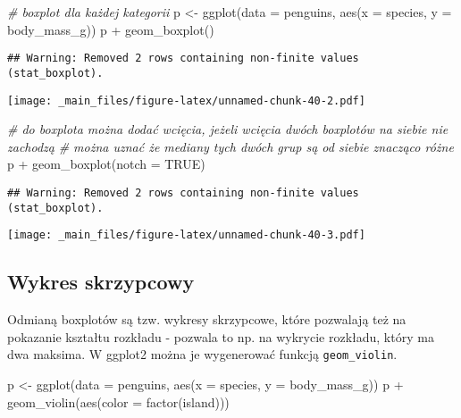 \documentclass[
]{book}
\newenvironment{Shaded}{\begin{snugshade}}{\end{snugshade}}
\newcommand{\AttributeTok}[1]{\textcolor[rgb]{0.77,0.63,0.00}{#1}}
\newcommand{\CommentTok}[1]{\textcolor[rgb]{0.56,0.35,0.01}{\textit{#1}}}
\newcommand{\ConstantTok}[1]{\textcolor[rgb]{0.00,0.00,0.00}{#1}}
\newcommand{\FunctionTok}[1]{\textcolor[rgb]{0.00,0.00,0.00}{#1}}
\newcommand{\NormalTok}[1]{#1}
\newcommand{\OtherTok}[1]{\textcolor[rgb]{0.56,0.35,0.01}{#1}}
\newcommand{\SpecialCharTok}[1]{\textcolor[rgb]{0.00,0.00,0.00}{#1}}
\begin{document}
\begin{Shaded}
\begin{Highlighting}[]
\CommentTok{\# boxplot dla każdej kategorii}
\NormalTok{p }\OtherTok{\textless{}{-}} \FunctionTok{ggplot}\NormalTok{(}\AttributeTok{data =}\NormalTok{ penguins, }\FunctionTok{aes}\NormalTok{(}\AttributeTok{x =}\NormalTok{ species, }\AttributeTok{y =}\NormalTok{ body\_mass\_g))}
\NormalTok{p }\SpecialCharTok{+} \FunctionTok{geom\_boxplot}\NormalTok{()}
\end{Highlighting}
\end{Shaded}

\begin{verbatim}
## Warning: Removed 2 rows containing non-finite values (stat_boxplot).
\end{verbatim}

\texttt{[image: \_main\_files/figure-latex/unnamed-chunk-40-2.pdf]}

\begin{Shaded}
\begin{Highlighting}[]
\CommentTok{\# do boxplota można dodać wcięcia, jeżeli wcięcia dwóch boxplotów na siebie nie zachodzą }
\CommentTok{\# można uznać że mediany tych dwóch grup są od siebie znacząco różne}
\NormalTok{p }\SpecialCharTok{+} \FunctionTok{geom\_boxplot}\NormalTok{(}\AttributeTok{notch =} \ConstantTok{TRUE}\NormalTok{)}
\end{Highlighting}
\end{Shaded}

\begin{verbatim}
## Warning: Removed 2 rows containing non-finite values (stat_boxplot).
\end{verbatim}

\texttt{[image: \_main\_files/figure-latex/unnamed-chunk-40-3.pdf]}

\hypertarget{wykres-skrzypcowy}{%
\subsection{Wykres skrzypcowy}\label{wykres-skrzypcowy}}

Odmianą boxplotów są tzw. wykresy skrzypcowe, które pozwalają też na pokazanie kształtu rozkładu - pozwala to np. na wykrycie rozkładu, który ma dwa maksima. W ggplot2 można je wygenerować funkcją \texttt{geom\_violin}.

\begin{Shaded}
\begin{Highlighting}[]
\NormalTok{p }\OtherTok{\textless{}{-}} \FunctionTok{ggplot}\NormalTok{(}\AttributeTok{data =}\NormalTok{ penguins, }\FunctionTok{aes}\NormalTok{(}\AttributeTok{x =}\NormalTok{ species, }\AttributeTok{y =}\NormalTok{ body\_mass\_g))}
\NormalTok{p }\SpecialCharTok{+} \FunctionTok{geom\_violin}\NormalTok{(}\FunctionTok{aes}\NormalTok{(}\AttributeTok{color =} \FunctionTok{factor}\NormalTok{(island)))}
\end{Highlighting}
\end{Shaded}
\end{document}
